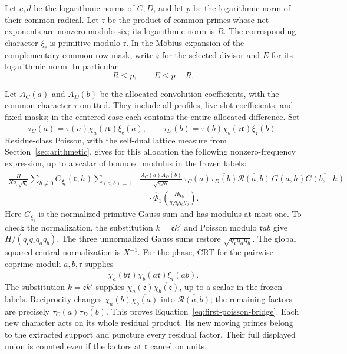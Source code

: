 \documentclass[11pt,a4paper]{article}
\numberwithin{equation}{section}
\numberwithin{figure}{section}
\theoremstyle{definition}
\theoremstyle{remark}
\begin{document}
Let \(c,d\) be the logarithmic norms of \(C,D\), and let \(p\) be the logarithmic norm of
their common radical.  Let \(\mathfrak r\) be the product of common
primes whose net exponents are nonzero modulo six; its logarithmic
norm is \(R\).  The corresponding character
\(\xi_{\mathfrak r}\) is primitive modulo \(\mathfrak r\).
In the M\"obius expansion of the complementary common row mask,
write \(\mathfrak e\) for the selected divisor and \(E\) for its
logarithmic norm.  In particular
\[
 R\le p,\qquad E\le p-R.
\]

Let \(A_C(a)\) and \(A_D(b)\) be the allocated convolution
coefficients, with the common character \(\tau\) omitted.  They
include all profiles, live slot coefficients, and fixed masks; in
the centered case each contains the entire allocated difference.
Set
\[
 \tau_C(a)=\tau(a)\chi_a(\mathfrak e\mathfrak r)
                       \xi_{\mathfrak r}(a),\qquad
 \tau_D(b)=\tau(b)\chi_b(\mathfrak e\mathfrak r)
                       \overline{\xi_{\mathfrak r}(b)}.
\]
Residue-class Poisson, with the self-dual lattice measure from
Section~\ref{sec:arithmetic}, gives for this allocation the following
nonzero-frequency expression, up to a scalar of bounded modulus in
the frozen labels:
\begin{equation}
 \begin{split}
 \frac{H}{Xq_{\mathfrak e}\sqrt{q_{\mathfrak r}}}
 \sum_{h\ne0}G_{\xi_{\mathfrak r}}(\mathfrak r,h)
 \sum_{(a,b)=1}
 &\frac{A_C(a)\overline{A_D(b)}}{\sqrt{q_aq_b}}\,
 \tau_C(a)\overline{\tau_D(b)}
 \overline{\mathcal R(a,b)}\,
 G(a,h)\overline{G(b,-h)}
 \\
 &\quad\cdot
 \widehat\Phi_1\left(
    \frac{Hq_h}{q_{\mathfrak e}q_{\mathfrak r}q_aq_b}
                    \right).
 \end{split}
 \label{eq:first-poisson-bridge}
\end{equation}
Here \(G_{\xi_{\mathfrak r}}\) is the normalized primitive Gauss
sum and has modulus at most one.  To check the normalization, the
substitution \(k=\mathfrak e k'\) and Poisson modulo
\(\mathfrak r ab\) give \(H/(q_{\mathfrak e}q_{\mathfrak r}q_aq_b)\).
The three unnormalized Gauss sums restore
\(\sqrt{q_{\mathfrak r}q_aq_b}\).  The global squared central
normalization is \(X^{-1}\).  For the phase, CRT for the pairwise coprime moduli
\(a,b,\mathfrak r\) supplies
\[
 \chi_a(b\mathfrak r)\overline{\chi_b(a\mathfrak r)}
       \xi_{\mathfrak r}(ab).
\]
The substitution \(k=\mathfrak e k'\) supplies
\(\chi_a(\mathfrak e)\overline{\chi_b(\mathfrak e)}\), up to a
scalar in the frozen labels.  Reciprocity changes
\(\chi_a(b)\overline{\chi_b(a)}\) into
\(\overline{\mathcal R(a,b)}\); the remaining factors are precisely
\(\tau_C(a)\overline{\tau_D(b)}\).  This proves
Equation~\eqref{eq:first-poisson-bridge}.  Each new character acts on
its whole residual product.  Its new moving primes belong to the
extracted support and puncture every residual factor.  Their full displayed
union is counted even if the factors at \(\mathfrak r\) cancel on units.
\end{document}
